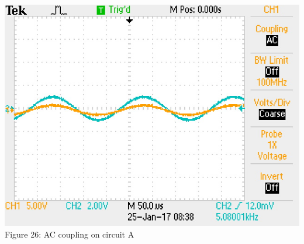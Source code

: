 \documentclass[]{article}
\begin{document}
\begin{center}
	\includegraphics[scale=0.7]{i_ac}\\
	Figure 26: AC coupling on circuit A
	\end{center}
\end{document}
